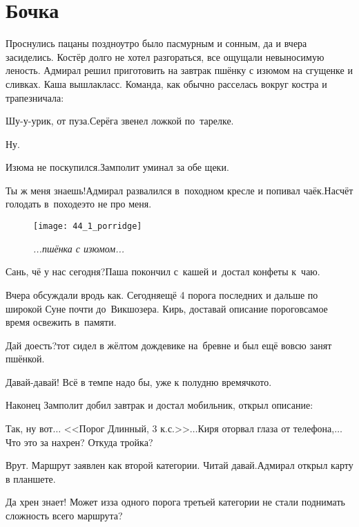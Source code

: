 \chapter{Бочка}
\vepsianrose

Проснулись пацаны поздно\mdash утро было пасмурным и сонным, да и вчера засиделись. Костёр долго не хотел разгораться, все ощущали невыносимую леность. Адмирал решил приготовить на завтрак пшёнку с изюмом на сгущенке и сливках. Каша вышла\mdash класс. Команда, как обычно расселась вокруг костра и трапезничала:

\diagdash Шу-у-урик, от пуза.\mdash Серёга звенел ложкой по~тарелке.

\diagdash Ну.

\diagdash Изюма не поскупился.\mdash Замполит уминал за обе щеки.

\diagdash Ты ж меня знаешь!\mdash Адмирал развалился в~походном кресле и попивал чаёк.\mdash Насчёт голодать в~походе\mdash это не про меня.

\begin{wrapfigure}[12]{l}{0.48\textwidth}
	\centering
	\texttt{[image: 44\_1\_porridge]}
	\caption{\small\textit{...пшёнка с изюмом...}}
\end{wrapfigure}
\diagdash Сань, чё у нас сегодня?\mdash Паша покончил с~кашей и~достал конфеты к~чаю.

\diagdash Вчера обсуждали вродь как. Сегодня\mdash ещё 4 порога последних и дальше по широкой Суне почти до~Викшозера. Кирь, доставай описание порогов\mdash самое время освежить в~памяти.

\diagdash Дай доесть?\mdash тот сидел в жёлтом дождевике на~бревне и был ещё вовсю занят пшёнкой.

\diagdash Давай-давай! Всё в темпе надо бы, уже к полудню времячко\sdash то.

Наконец Замполит добил завтрак и достал мобильник, открыл описание:

\diagdash Так, ну вот$\ldots$ <<Порог Длинный, 3 к.с.>>$\ldots$\mdash Киря оторвал глаза от телефона,\mdash $\ldots$Что это за нахрен? Откуда тройка?

\diagdash Врут. Маршрут заявлен как второй категории. Читай давай.\mdash Адмирал открыл карту в планшете.

\diagdash Да хрен знает! Может из\sdash за одного порога третьей категории не стали поднимать сложность всего маршрута? 

